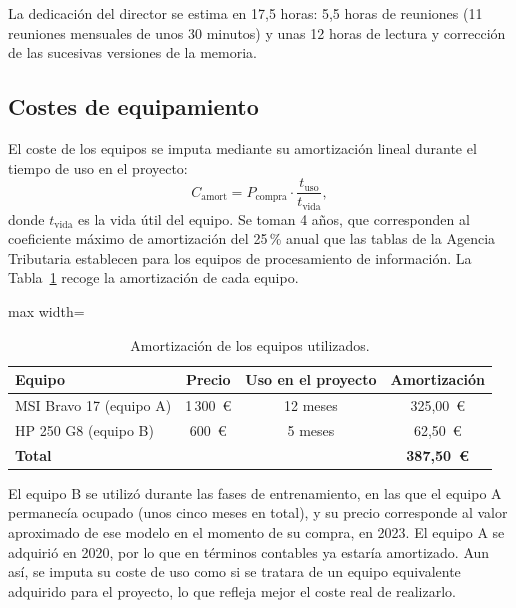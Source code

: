 La dedicación del director se estima en 17,5 horas: 5,5 horas de reuniones (11 reuniones mensuales de unos 30 minutos) y unas 12 horas de lectura y corrección de las sucesivas versiones de la memoria.

\subsection{Costes de equipamiento}\label{sec:costes_equipos}

El coste de los equipos se imputa mediante su amortización lineal durante el tiempo de uso en el proyecto:
\begin{equation}\label{eq:amortizacion}
	C_{\text{amort}} = P_{\text{compra}} \cdot \frac{t_{\text{uso}}}{t_{\text{vida}}},
\end{equation}
donde $t_{\text{vida}}$ es la vida útil del equipo. Se toman 4 años, que corresponden al coeficiente máximo de amortización del 25\,\% anual que las tablas de la Agencia Tributaria establecen para los equipos de procesamiento de información. La Tabla~\ref{tab:amortizacion} recoge la amortización de cada equipo.

\begin{table}[H]
	\centering
	\small
	\begin{adjustbox}{max width=\textwidth}
	\begin{tabular}{lccc}
		\toprule
		\textbf{Equipo} & \textbf{Precio} & \textbf{Uso en el proyecto} & \textbf{Amortización} \\
		\midrule
		MSI Bravo 17 (equipo A) & 1\,300~€ & 12 meses & 325,00~€ \\
		HP 250 G8 (equipo B) & 600~€ & 5 meses & 62,50~€ \\
		\midrule
		\textbf{Total} & & & \textbf{387,50~€} \\
		\bottomrule
	\end{tabular}
	\end{adjustbox}
	\caption{Amortización de los equipos utilizados.}
	\label{tab:amortizacion}
\end{table}

El equipo B se utilizó durante las fases de entrenamiento, en las que el equipo A permanecía ocupado (unos cinco meses en total), y su precio corresponde al valor aproximado de ese modelo en el momento de su compra, en 2023. El equipo A se adquirió en 2020, por lo que en términos contables ya estaría amortizado. Aun así, se imputa su coste de uso como si se tratara de un equipo equivalente adquirido para el proyecto, lo que refleja mejor el coste real de realizarlo.

